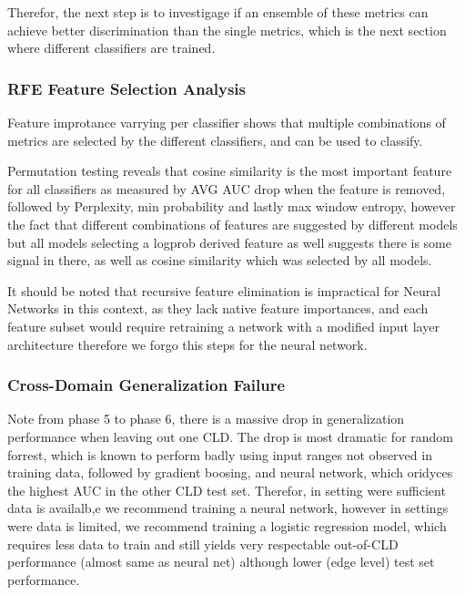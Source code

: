 Therefor, the next step is to investigage if an ensemble of these metrics can achieve better discrimination than the single metrics, which is the next section where different classifiers are trained.

\subsubsection{RFE Feature Selection Analysis}

Feature improtance varrying per classifier shows that multiple combinations of metrics are selected by the different classifiers, and can be used to classify.

Permutation testing reveals that cosine similarity is the most important feature for all classifiers as measured by AVG AUC drop when the feature is removed, followed by Perplexity, min probability and lastly max window entropy, however the fact that different combinations of features are suggested by different models but all models selecting a logprob derived feature as well suggests there is some signal in there, as well as cosine similarity which was selected by all models.

It should be noted that recursive feature elimination is impractical for Neural Networks in this context, as they lack native feature importances, and each feature subset would require retraining a network with a modified input layer architecture therefore we forgo this steps for the neural network.


\subsubsection{Cross-Domain Generalization Failure}

Note from phase 5 to phase 6, there is a massive drop in generalization performance when leaving out one CLD.
The drop is most dramatic for random forrest, which is known to perform badly using input ranges not observed in training data, followed by gradient boosing, and neural network, which oridyces the highest AUC in the other CLD test set. Therefor, in setting were sufficient data is availalb,e we recommend training a neural network, however in settings were data is limited, we recommend training a logistic regression model, which requires less data to train and still yields very respectable out-of-CLD performance (almost same as neural net) although lower (edge level) test set performance.

